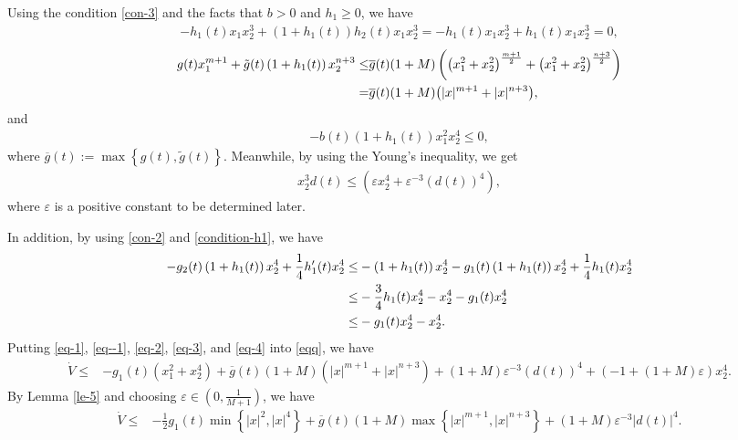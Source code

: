 \documentclass[onecolumn]{autart}
\newenvironment{proof of Prop.ODE}{{\it Proof of Proposition~\ref{Prop.ODE}:\enspace}}{\hfill $\blacksquare$\par}
\newenvironment{proof of PDE}{{\it Proof of Proposition \ref{Prop.8}:\enspace}}{\hfill $\blacksquare$\par}
\begin{document}
{\begin{proof of Prop.ODE}
{Using the condition} \eqref{con-3} and the facts that $b> 0$  and $h_1\ge 0$, we have
\begin{align}\label{eq-1}
-h_1(t) x_1 x_2^3+\left(1+h_1(t)\right) h_2(t) x_1 x_2^3
=  -h_1(t) x_1 x_2^3+h_1(t) x_1 x_2^3=0,
\end{align}
\begin{align}\label{eq--1}
g(t)x_1^{m+1}+\tilde{g}(t)\left(1+h_1(t)\right) x_2^{n+3}\leq& \overline{g}(t)(1+M)\left(\left(x^2_1+x^2_2\right)^{\frac{m+1}{2}}+\left(x^2_1+x^2_2\right)^{\frac{n+3}{2}}\right)\notag\\
= &\overline{g}(t)(1+M){\left(|x|^{m+1}+|x|^{n+3}\right)},
\end{align}
and
\begin{align}\label{eq-2}
-b(t)\left(1+h_1(t)\right) x_1^2 x_2^4 \leq 0,
\end{align}
where ${\overline{g}(t):=\max\left\{g(t),\tilde{g}(t)\right\}}$. Meanwhile, by using the Young's inequality, we get
\begin{align}\label{eq-3}
x_2^3 d(t)
\leq  \left(\varepsilon x_2^4+\varepsilon^{-3}(d(t))^4\right),
\end{align}
where $\varepsilon$ is a positive constant  to be determined later.

In addition, by using \eqref{con-2} and \eqref{condition-h1}, we have
\begin{align}\label{eq-4}
-g_2(t)\left(1+h_1(t)\right) x_2^4 +\frac{1}{4} h_1^{\prime}(t) x_2^4
\leq & -\left(1+h_1(t)\right) x_2^4-g_1(t)\left(1+h_1(t)\right) x_2^4  +\frac{1}{4} h_1(t) x_2^4 \notag\\
\leq & -\frac{3}{4} h_1(t) x_2^4- x_2^4-g_1(t) x_2^4 \notag\\
\leq & -g_1(t) x_2^4- x_2^4.
\end{align}
Putting \eqref{eq-1}, \eqref{eq--1}, \eqref{eq-2}, \eqref{eq-3}, and \eqref{eq-4} into \eqref{eqq}, we have
\begin{align*}
\dot{V} \leq & -g_1(t)\left(x_1^2+x_2^4\right)+{\overline{g}(t)(1+M) {\left(|x|^{m+1}+|x|^{n+3}\right)}}+(1+M) \varepsilon^{-3}(d(t))^4+(-1+(1+M)\varepsilon)x^4_2.
\end{align*}
By Lemma \ref{le-5} and choosing $\varepsilon\in\left(0, \frac{1}{M+1}\right)$, we have \begin{align*}
\dot{V} 	
\leq& -\frac{1}{2}g_1(t)\min {\left\{|x|^2, |x|^4\right\}}+{\overline{g}(t)(1+M) \max{\left\{|x|^{m+1},|x|^{n+3}\right\}}}+(1+M) \varepsilon^{-3} |d(t) |^4.
\end{align*}


\end{proof of Prop.ODE}}
\end{document}
